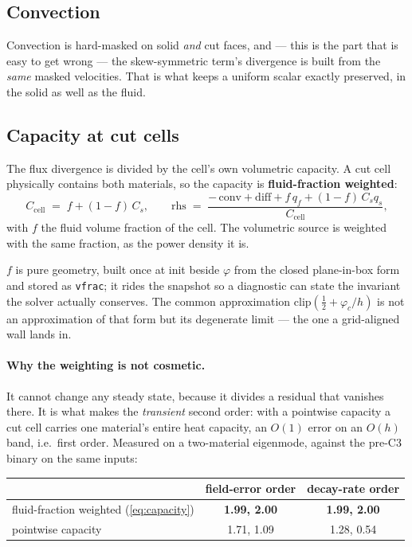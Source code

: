 \documentclass[11pt,a4paper]{article}
\newcommand{\code}[1]{\texttt{#1}}
\begin{document}
\subsection{Convection}
Convection is hard-masked on solid \emph{and} cut faces, and --- this is the
part that is easy to get wrong --- the skew-symmetric term's divergence is
built from the \emph{same} masked velocities. That is what keeps a uniform
scalar exactly preserved, in the solid as well as the fluid.

\subsection{Capacity at cut cells}
The flux divergence is divided by the cell's own volumetric capacity. A cut
cell physically contains both materials, so the capacity is
\textbf{fluid-fraction weighted}:
\begin{equation}
  C_{\text{cell}} \;=\; f + (1-f)\,C_s ,
  \qquad
  \text{rhs} \;=\;
  \frac{-\,\text{conv} + \text{diff} + f\,q_f + (1-f)\,C_s q_s}
       {C_{\text{cell}}} ,
  \label{eq:capacity}
\end{equation}
with $f$ the fluid volume fraction of the cell. The volumetric source is
weighted with the same fraction, as the power density it is.

$f$ is pure geometry, built once at init beside $\varphi$ from the closed
plane-in-box form and stored as \code{vfrac}; it rides the snapshot so a
diagnostic can state the invariant the solver actually conserves. The common
approximation $\mathrm{clip}(\tfrac12+\varphi_c/h)$ is not an approximation of
that form but its degenerate limit --- the one a grid-aligned wall lands in.

\paragraph{Why the weighting is not cosmetic.}
It cannot change any steady state, because it divides a residual that vanishes
there. It is what makes the \emph{transient} second order: with a pointwise
capacity a cut cell carries one material's entire heat capacity, an $O(1)$
error on an $O(h)$ band, i.e.\ first order. Measured on a two-material
eigenmode, against the pre-C3 binary on the same inputs:

\begin{center}
\begin{tabular}{lcc}
\toprule
 & field-error order & decay-rate order \\
\midrule
fluid-fraction weighted (\ref{eq:capacity}) & \textbf{1.99, 2.00} & \textbf{1.99, 2.00} \\
pointwise capacity                          & 1.71, 1.09          & 1.28, 0.54 \\
\bottomrule
\end{tabular}
\end{center}
\end{document}
